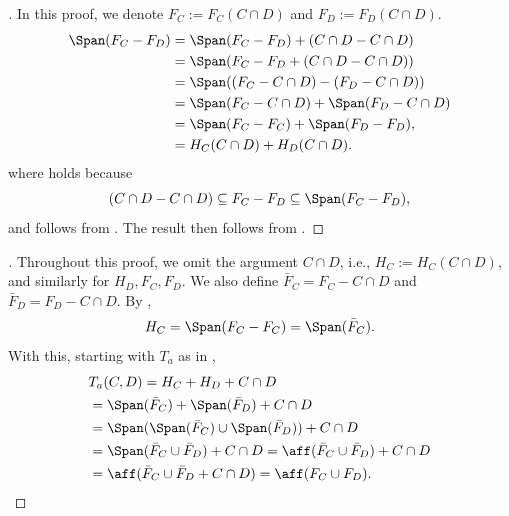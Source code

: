 \documentclass{article}
\theoremstyle{plain}
\theoremstyle{definition}
\theoremstyle{remark}
\begin{document}
\begin{proof}[\hypertarget{loc:joint_supporting_subspace_from_difference_of_faces.proof}Proof of \Cref{loc:joint_supporting_subspace_from_difference_of_faces.statement}]

In this proof, we denote $F_C := F_C(C \cap D)$ and $F_D := F_D(C \cap D)$.
\begin{align}
\Span(F_C-F_D) &= \Span(F_C-F_D) + (C \cap D - C \cap D) \label{eq:diff_face:1}\\
 &= \Span(F_C - F_D + (C \cap D  - C \cap D)) \label{eq:diff_face:2}\\
 &= \Span((F_C - C \cap D) -(F_D-C \cap D)) \label{eq:diff_face:3}\\
 &= \Span(F_C - C \cap D) +\Span(F_D-C \cap D) \label{eq:diff_face:4}\\
 &= \Span(F_C - F_C) + \Span(F_D- F_D), \label{eq:diff_face:5}\\
&= H_C(C \cap D) + H_D(C \cap D). \label{eq:diff_face:6}\\
\end{align}
where  holds because 
\begin{equation*}
(C \cap D - C \cap D) \subseteq F_C - F_D \subseteq  \Span(F_C-F_D),
\end{equation*}
and  follows from .
The result then follows from 
.
\end{proof}
\begin{proof}[\hypertarget{loc:joint_supporting_subspace_as_affine_hull.proof}Proof of \Cref{loc:joint_supporting_subspace_as_affine_hull.statement}]

Throughout this proof, we omit the argument $C \cap D$, i.e., 
$H_C := H_C(C \cap D)$, and similarly
for $H_D, F_C, F_D$. 
We also define $\bar{F}_C = F_C-C \cap D$ and $\bar{F}_D = F_D - C \cap D$.
By ,
\begin{equation*}
H_C= \Span(F_C-F_C)= \Span(\bar{F}_C).
\end{equation*}
With this, starting with $T_a$ as in ,
\begin{align*}
&T_a(C, D) = H_C + H_D + C \cap D\\  
&= \Span(\bar{F}_C) + \Span(\bar{F}_D) + C \cap D\\
&= \Span(\Span(\bar{F}_C) \cup \Span(\bar{F}_D)) + C \cap D\\
&= \Span(\bar{F}_C \cup \bar{F}_D) + C \cap D
= \aff(\bar{F}_C \cup \bar{F}_D) + C \cap D\\
 &= \aff(\bar{F}_C \cup \bar{F}_D + C \cap D) 
 = \aff(F_C \cup F_D).
\end{align*}
\end{proof}
\end{document}
